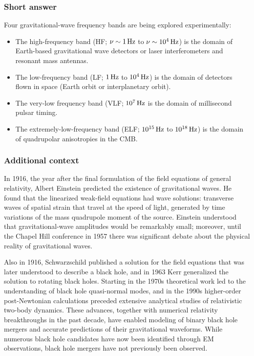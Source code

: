 \documentclass[a4paper,10pt]{article}
\begin{document}
\subsubsection{Short answer}

Four gravitational-wave frequency bands are being explored experimentally:

\begin{itemize}
    \item The high-frequency band (HF; $\nu\sim1\,{\rm Hz}$ to $\nu\sim10^4\,{\rm Hz}$) is the domain of Earth-based gravitational wave detectors or laser interferometers and resonant mass antennas.
    \item The low-frequency band (LF; $1\,{\rm Hz}$ to $10^4\,{\rm Hz}$) is the domain of detectors flown in space (Earth orbit or interplanetary orbit).
    \item The very-low frequency band (VLF; $10^7\,{\rm Hz}$ is the domain of millisecond pulsar timing.
    \item The extremely-low-frequency band (ELF; $10^{15}\,{\rm Hz}$ to $10^{18}\,{\rm Hz}$) is the domain of quadrupolar anisotropies in the CMB.
\end{itemize}

\subsubsection{Additional context}

In 1916, the year after the final formulation of the field equations of general relativity, Albert Einstein predicted the existence of gravitational waves. He found that the linearized weak-field equations had wave solutions: transverse waves of spatial strain that travel at the speed of light, generated by time variations of the mass quadrupole moment of the source. Einstein understood that gravitational-wave amplitudes would be remarkably small; moreover, until the Chapel Hill conference in 1957 there was significant debate about the physical reality of gravitational waves.

{\noindent}Also in 1916, Schwarzschild published a solution for the field equations that was later understood to describe a black hole, and in 1963 Kerr generalized the solution to rotating black holes. Starting in the 1970s theoretical work led to the understanding of black hole quasi-normal modes, and in the 1990s higher-order post-Newtonian calculations preceded extensive analytical studies of relativistic two-body dynamics. These advances, together with numerical relativity breakthroughs in the past decade, have enabled modeling of binary black hole mergers and accurate predictions of their gravitational waveforms. While numerous black hole candidates have now been identified through EM observations, black hole mergers have not previously been observed.
\end{document}
